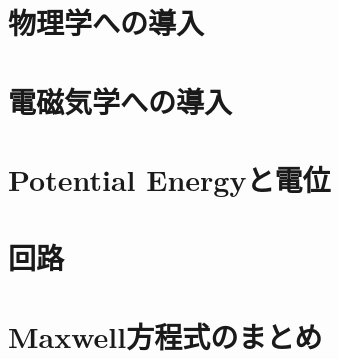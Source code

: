 \documentclass[a4paper,papersize,openany,12Q]{jsbook}
\begin{document}
\resettagform%
\frontmatter
\chapter{物理学への導入}

\begin{fullwidthpage}
 \tableofcontents
\end{fullwidthpage}
\mainmatter
\chapter{電磁気学への導入}

\chapter{Potential Energyと電位}

\chapter{回路}

\chapter{Maxwell方程式のまとめ}

\end{document}
